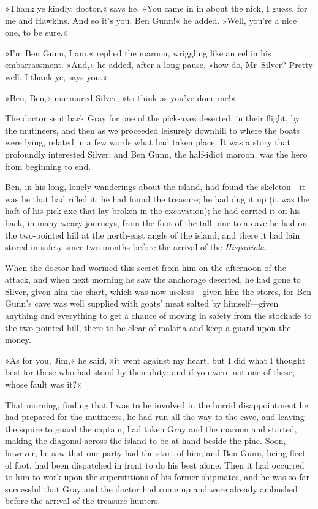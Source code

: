 »Thank ye kindly, doctor,« says he. »You came in in about the nick, I guess, for me and Hawkins. And so it's you, Ben Gunn!« he added. »Well, you're a nice one, to be sure.«

»I'm Ben Gunn, I am,« replied the maroon, wriggling like an eel in his embarrassment. »And,« he added, after a long pause, »how do, Mr~Silver? Pretty well, I thank ye, says you.«

»Ben, Ben,« murmured Silver, »to think as you've done me!«

The doctor sent back Gray for one of the pick-axes deserted, in their flight, by the mutineers, and then as we proceeded leisurely downhill to where the boats were lying, related in a few words what had taken place. It was a story that profoundly interested Silver; and Ben Gunn, the half-idiot maroon, was the hero from beginning to end.

Ben, in his long, lonely wanderings about the island, had found the skeleton—it was he that had rifled it; he had found the treasure; he had dug it up (it was the haft of his pick-axe that lay broken in the excavation); he had carried it on his back, in many weary journeys, from the foot of the tall pine to a cave he had on the two-pointed hill at the north-east angle of the island, and there it had lain stored in safety since two months before the arrival of the \textit{Hispaniola}.

When the doctor had wormed this secret from him on the afternoon of the attack, and when next morning he saw the anchorage deserted, he had gone to Silver, given him the chart, which was now useless—given him the stores, for Ben Gunn's cave was well supplied with goats' meat salted by himself—given anything and everything to get a chance of moving in safety from the stockade to the two-pointed hill, there to be clear of malaria and keep a guard upon the money.

»As for you, Jim,« he said, »it went against my heart, but I did what I thought best for those who had stood by their duty; and if you were not one of these, whose fault was it?«

That morning, finding that I was to be involved in the horrid disappointment he had prepared for the mutineers, he had run all the way to the cave, and leaving the squire to guard the captain, had taken Gray and the maroon and started, making the diagonal across the island to be at hand beside the pine. Soon, however, he saw that our party had the start of him; and Ben Gunn, being fleet of foot, had been dispatched in front to do his best alone. Then it had occurred to him to work upon the superstitions of his former shipmates, and he was so far successful that Gray and the doctor had come up and were already ambushed before the arrival of the treasure-hunters.


